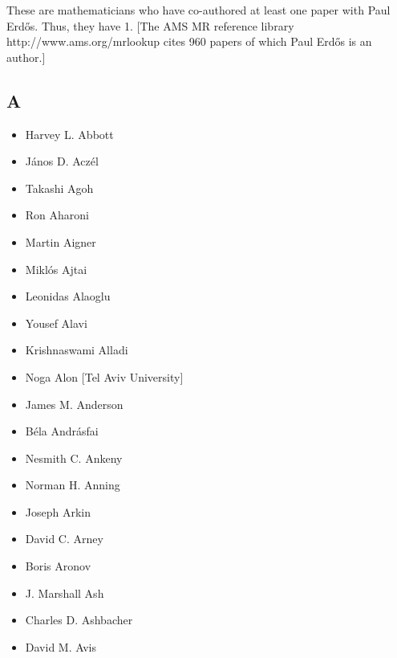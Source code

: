 \documentclass[12pt]{article}
\begin{document}
These are mathematicians who have co-authored at least one paper with Paul Erd\H{o}s.  Thus, they have  1.
[The AMS MR reference library http://www.ams.org/mrlookup cites 960 papers
of which Paul Erd\H{o}s is an author.]

\addtocounter{section}{1}
\subsection{A}
\begin{itemize}
\item Harvey L. Abbott
\item J\'{a}nos D. Acz\'{e}l
\item Takashi Agoh
\item Ron Aharoni
\item Martin Aigner
\item Mikl\'{o}s Ajtai
\item Leonidas Alaoglu
\item Yousef Alavi
\item Krishnaswami Alladi
\item Noga Alon [Tel Aviv University]
\item James M. Anderson
\item B\'{e}la Andr\'{a}sfai
\item Nesmith C. Ankeny
\item Norman H. Anning
\item Joseph Arkin
\item David C. Arney
\item Boris Aronov
\item J. Marshall Ash
\item Charles D. Ashbacher
\item David M. Avis
\end{itemize}
\end{document}
